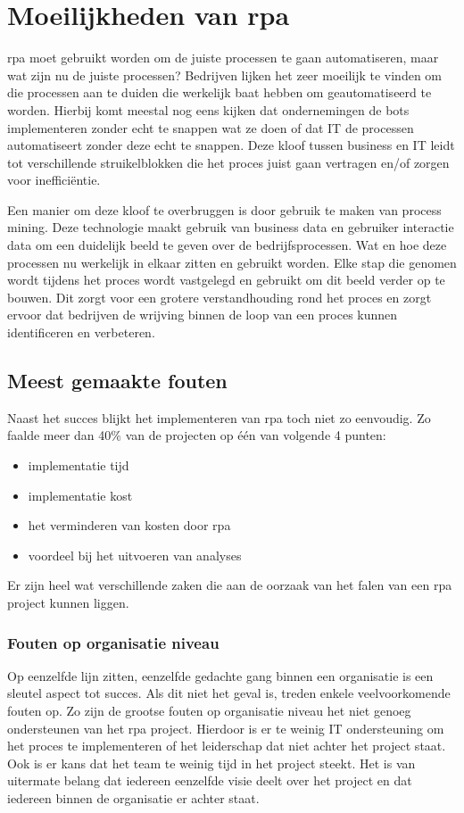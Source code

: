 \section{Moeilijkheden van \acrshort{rpa}}
\acrshort{rpa} moet gebruikt worden om de juiste processen te gaan automatiseren, maar wat zijn nu de juiste processen? Bedrijven lijken het zeer moeilijk te vinden om die processen aan te duiden die werkelijk baat hebben om geautomatiseerd te worden. Hierbij komt meestal nog eens kijken dat ondernemingen de bots implementeren zonder echt te snappen wat ze doen of dat IT de processen automatiseert zonder deze echt te snappen. Deze kloof tussen business en IT leidt tot verschillende struikelblokken die het proces juist gaan vertragen en/of zorgen voor inefficiëntie. \autocite{cFutRPA}

Een manier om deze kloof te overbruggen is door gebruik te maken van process mining. Deze technologie maakt gebruik van business data en gebruiker interactie data om een duidelijk beeld te geven over de bedrijfsprocessen. Wat en hoe deze processen nu werkelijk in elkaar zitten en gebruikt worden. Elke stap die genomen wordt tijdens het proces wordt vastgelegd en gebruikt om dit beeld verder op te bouwen. Dit zorgt voor een grotere verstandhouding rond het proces en zorgt ervoor dat bedrijven de wrijving binnen de loop van een proces kunnen identificeren en verbeteren. \autocite{cFutRPA}

\subsection{Meest gemaakte fouten}
Naast het succes blijkt het implementeren van \acrshort{rpa} toch niet zo eenvoudig. Zo faalde meer dan 40\% van de projecten op één van volgende 4 punten:
\begin{itemize}
	\item implementatie tijd
	\item implementatie kost
	\item het verminderen van kosten door \acrshort{rpa}
	\item voordeel bij het uitvoeren van analyses
\end{itemize}

Er zijn heel wat verschillende zaken die aan de oorzaak van het falen van een \acrshort{rpa} project kunnen liggen. \autocite{pitfallsRPA}

\subsubsection{Fouten op organisatie niveau}
Op eenzelfde lijn zitten, eenzelfde gedachte gang binnen een organisatie is een sleutel aspect tot succes. Als dit niet het geval is, treden enkele veelvoorkomende fouten op. Zo zijn de grootse fouten op organisatie niveau het niet genoeg ondersteunen van het \acrshort{rpa} project. Hierdoor is er te weinig IT ondersteuning om het proces te implementeren of het leiderschap dat niet achter het project staat. Ook is er kans dat het team te weinig tijd in het project steekt. Het is van uitermate belang dat iedereen eenzelfde visie deelt over het project en dat iedereen binnen de organisatie er achter staat. \autocite{pitfallsRPA}

